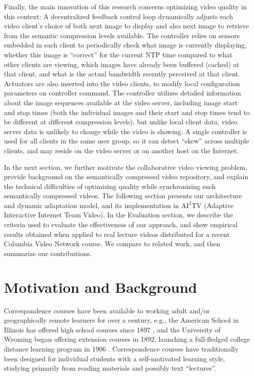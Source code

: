 \documentclass{sig-alternate}
\begin{document}
Finally, the main innovation of this research concerns optimizing
video quality in this context: A decentralized feedback control loop
dynamically adjusts each video client's choice of both next image to
display and also next image to retrieve from the semantic compression
levels available.  The controller relies on sensors embedded in each
client to periodically check what image is currently displaying,
whether this image is ``correct'' for the current NTP time compared to
what other clients are viewing, which images have already been
buffered (cached) at that client, and what is the actual bandwidth
recently perceived at that client.  Actuators are also inserted into
the video clients, to modify local configuration parameters on
controller command. The controller utilizes detailed information about
the image sequences available at the video server, including image
start and stop times (both the individual images and their start and
stop times tend to be different at different compression levels), but
unlike local client data, video server data is unlikely to change
while the video is showing.  A single controller is used for all
clients in the same user group, so it can detect ``skew'' across
multiple clients, and may reside on the video server or on another
host on the Internet.

In the next section, we further motivate the collaborative video
viewing problem, provide background on the semantically compressed
video repository, and explain the technical difficulties of optimizing
quality while synchronizing such semantically compressed videos. The
following section presents our architecture and dynamic adaptation
model, and its implementation in $\mathrm{AI}^2$TV (Adaptive
Interactive Internet Team Video).  In the Evaluation section, we
describe the criteria used to evaluate the effectiveness of our
approach, and show empirical results obtained when applied to real
lecture videos distributed for a recent Columbia Video Network
course. We compare to related work, and then summarize our
contributions.

\section{Motivation and Background} \label{background}


Correspondence courses have been available to working adult and/or
geographically remote learners for over a century, e.g., the American
School in Illinois has offered high school courses since 1897
\cite{AmericanSchool}, and the University of Wyoming began offering
extension courses in 1892, launching a full-fledged college distance
learning program in 1906 \cite{UWyoming}.  Correspondence courses have
traditionally been designed for individual students with a
self-motivated learning style, studying primarily from reading
materials and possibly text ``lectures''.
\end{document}
